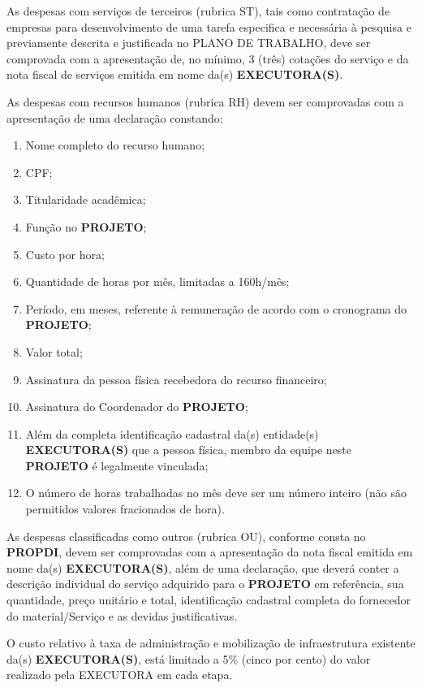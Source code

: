 \xxx  As despesas com serviços de terceiros (rubrica ST), tais como contratação de empresas para desenvolvimento de uma tarefa especifica e necessária à pesquisa e previamente descrita e justificada no PLANO DE TRABALHO, deve ser comprovada com a apresentação de, no mínimo, 3 (três) cotações do serviço e da nota fiscal de serviços emitida em nome da(s) \textbf{EXECUTORA(S)}.

\xxx  As despesas com recursos humanos (rubrica RH) devem ser comprovadas com a apresentação de uma declaração constando:

\begin{enumerate}[label=\alph*), leftmargin=3cm]
    \item Nome completo do recurso humano;
    \item CPF;
    \item Titularidade acadêmica;
    \item Função no \textbf{PROJETO};
    \item Custo por hora;
    \item Quantidade de horas por mês, limitadas a 160h/mês;
    \item Período, em meses, referente à remuneração de acordo com o cronograma do \textbf{PROJETO};
    \item Valor total;
    \item Assinatura da pessoa física recebedora do recurso financeiro;
    \item Assinatura do Coordenador do \textbf{PROJETO};
    \item Além da completa identificação cadastral da(s) entidade(s) \textbf{EXECUTORA(S)} que a pessoa física, membro da equipe neste \textbf{PROJETO} é legalmente vinculada;
    \item O número de horas trabalhadas no mês deve ser um número inteiro (não são permitidos valores fracionados de hora).

\end{enumerate}

\xxx  As despesas classificadas como outros (rubrica OU), conforme consta no \textbf{PROPDI}, devem ser comprovadas com a apresentação da nota fiscal emitida em nome da(s) \textbf{EXECUTORA(S)}, além de uma declaração, que deverá conter a descrição individual do serviço adquirido para o \textbf{PROJETO} em referência, sua quantidade, preço unitário e total, identificação cadastral completa do fornecedor do material/Serviço e as devidas justificativas.

\xxxx O custo relativo à taxa de administração e mobilização de infraestrutura existente da(s) \textbf{EXECUTORA(S)}, está limitado a 5\% (cinco por cento) do valor realizado pela EXECUTORA em cada etapa.


